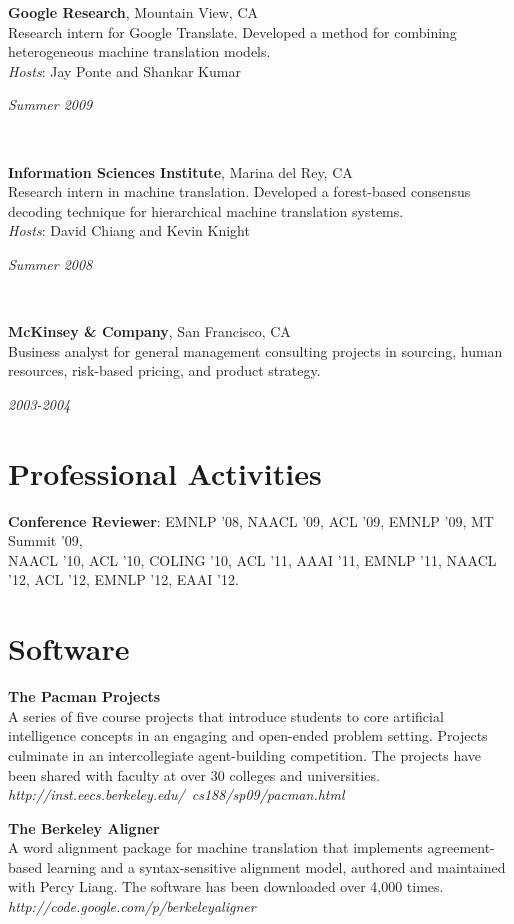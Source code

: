\documentclass[margin,line]{res}
\newcommand{\dated}[2]{\parbox[t]{4.4in}{#1} \hspace{0.4in}
											 \parbox[t]{1in}{ {\it #2 } } }
\begin{document}
\begin{resume}
\dated{ {\bf Google Research}, Mountain View, CA\\
Research intern for Google Translate.  Developed a method for combining
heterogeneous machine translation models. \\
{\em Hosts}: Jay Ponte and Shankar Kumar
}{Summer 2009} \\

\dated{ {\bf Information Sciences Institute}, Marina del Rey, CA \\
Research intern in machine translation. Developed a forest-based consensus
decoding technique for hierarchical machine translation systems. \\
{\em Hosts}: David Chiang and Kevin Knight}{Summer 2008} \\

\dated{ {\bf McKinsey \& Company}, San Francisco, CA \\
Business analyst for general management consulting projects in sourcing, human
resources, risk-based pricing, and product strategy.}{2003-2004}

\newpage

\section{\sc Professional Activities}

{\bf Conference Reviewer}: EMNLP '08, NAACL '09, ACL '09, EMNLP '09, MT Summit
'09,\\ NAACL '10, ACL '10, COLING '10, ACL '11, AAAI '11, EMNLP '11, NAACL '12,
ACL '12, EMNLP '12, EAAI '12.

\section{\sc Software}

{\bf The Pacman Projects} \\
A series of five course projects that introduce students to core artificial
intelligence concepts in an engaging and open-ended problem setting. Projects
culminate in an intercollegiate agent-building competition. The projects have
been shared with faculty at over 30 colleges and universities.\\
{\it http://inst.eecs.berkeley.edu/~cs188/sp09/pacman.html }

{\bf The Berkeley Aligner } \\
A word alignment package for machine translation that implements agreement-based
learning and a syntax-sensitive alignment model, authored and maintained with
Percy Liang. The software has been downloaded over 4,000 times. \\
{\it http://code.google.com/p/berkeleyaligner }

\end{resume}
\end{document}
